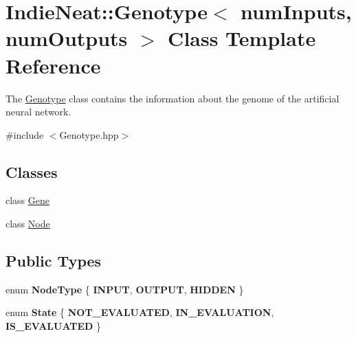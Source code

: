 \hypertarget{class_indie_neat_1_1_genotype}{}\section{Indie\+Neat\+:\+:Genotype$<$ num\+Inputs, num\+Outputs $>$ Class Template Reference}
\label{class_indie_neat_1_1_genotype}


The \hyperlink{class_indie_neat_1_1_genotype}{Genotype} class contains the information about the genome of the artificial neural network.  




{\ttfamily \#include $<$Genotype.\+hpp$>$}

\subsection*{Classes}
\begin{DoxyCompactItemize}
\item 
class \hyperlink{class_indie_neat_1_1_genotype_1_1_gene}{Gene}
\item 
class \hyperlink{class_indie_neat_1_1_genotype_1_1_node}{Node}
\end{DoxyCompactItemize}
\subsection*{Public Types}
\begin{DoxyCompactItemize}
\item 
\mbox{\label{class_indie_neat_1_1_genotype_a3c565c5d61ead686f245d585ddfa2507}} 
enum {\bfseries Node\+Type} \{ {\bfseries I\+N\+P\+UT}, 
{\bfseries O\+U\+T\+P\+UT}, 
{\bfseries H\+I\+D\+D\+EN}
 \}
\item 
\mbox{\label{class_indie_neat_1_1_genotype_a2e76da677f35a309198db3465cbf6561}} 
enum {\bfseries State} \{ {\bfseries N\+O\+T\+\_\+\+E\+V\+A\+L\+U\+A\+T\+ED}, 
{\bfseries I\+N\+\_\+\+E\+V\+A\+L\+U\+A\+T\+I\+ON}, 
{\bfseries I\+S\+\_\+\+E\+V\+A\+L\+U\+A\+T\+ED}
 \}
\end{DoxyCompactItemize}
